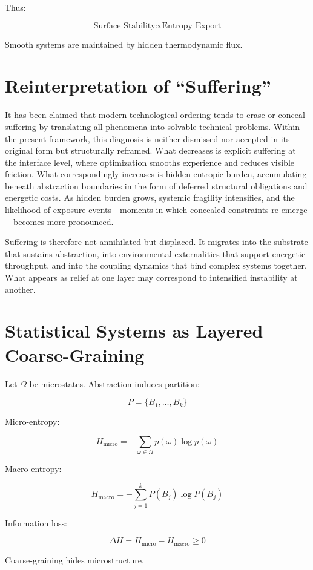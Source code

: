 \documentclass[11pt,openany]{book}
\begin{document}
Thus:

\[
\text{Surface Stability} \propto \text{Entropy Export}
\]

Smooth systems are maintained by hidden thermodynamic flux.

\section{Reinterpretation of ``Suffering''}

It has been claimed that modern technological ordering tends to erase or 
conceal suffering by translating all phenomena into solvable technical problems. 
Within the present framework, this diagnosis is neither dismissed nor accepted 
in its original form but structurally reframed. What decreases is explicit 
suffering at the interface level, where optimization smooths experience and 
reduces visible friction. What correspondingly increases is hidden entropic 
burden, accumulating beneath abstraction boundaries in the form of deferred 
structural obligations and energetic costs. As hidden burden grows, systemic 
fragility intensifies, and the likelihood of exposure events—moments in which 
concealed constraints re-emerge—becomes more pronounced.

Suffering is therefore not annihilated but displaced. It migrates into the 
substrate that sustains abstraction, into environmental externalities that 
support energetic throughput, and into the coupling dynamics that bind 
complex systems together. What appears as relief at one layer may correspond 
to intensified instability at another.

\section{Statistical Systems as Layered Coarse-Graining}

Let $\Omega$ be microstates.
Abstraction induces partition:

\[
P = \{B_1, \dots, B_k\}
\]

Micro-entropy:

\[
H_{\text{micro}} = -\sum_{\omega \in \Omega} p(\omega)\log p(\omega)
\]

Macro-entropy:

\[
H_{\text{macro}} = -\sum_{j=1}^k P(B_j)\log P(B_j)
\]

Information loss:

\[
\Delta H = H_{\text{micro}} - H_{\text{macro}} \geq 0
\]

Coarse-graining hides microstructure.
\end{document}

